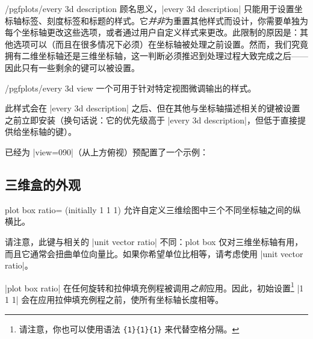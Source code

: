 {\begin{stylekey}{/pgfplots/every 3d description}
    顾名思义，|every 3d description| 只能用于设置坐标轴标签、刻度标签和标题的样式。它\emph{并非}为重置其他样式而设计，你需要单独为每个坐标轴更改这些选项，或者通过用户自定义样式来更改。此限制的原因是：其他选项可以（而且在很多情况下必须）在坐标轴被处理之前设置。然而，我们究竟拥有二维坐标轴还是三维坐标轴，这一判断必须推迟到处理过程大致完成之后——因此只有一些剩余的键可以被设置。
\end{stylekey}

\begin{stylekey}{/pgfplots/every 3d view }
    一个可用于针对特定视图微调输出的样式。

    此样式会在 |every 3d description| 之后、但在其他与坐标轴描述相关的键被设置之前立即安装（换句话说：它的优先级高于 |every 3d description|，但低于直接提供给坐标轴的键）。

    已经为 |view={0}{90}|（从上方俯视）预配置了一个示例：
\begin{codeexample}
\end{codeexample}
\end{stylekey}


\subsection{三维盒的外观}

\begin{pgfplotskey}{plot box ratio= (initially 1 1 1)}
    允许自定义三维绘图中三个不同坐标轴之间的纵横比。

    请注意，此键与相关的 |unit vector ratio| 不同：plot box 仅对三维坐标轴有用，而且它通常会扭曲单位向量比。如果你希望单位比相等，请考虑使用 |unit vector ratio|。

    |plot box ratio| 在任何旋转和拉伸填充例程被调用\emph{之前}应用。因此，初始设置\footnote{请注意，你也可以使用语法 \texttt{\{1\}\{1\}\{1\}} 来代替空格分隔。} |1 1 1| 会在应用拉伸填充例程之前，使所有坐标轴长度相等。
\pgfplotsexpensiveexample
\begin{codeexample}[]
\end{codeexample}


\end{pgfplotskey}}
